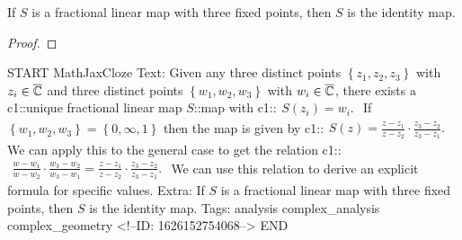 \documentclass{memoir}
\begin{document}
\begin{lemma}
	If \(S\) is a fractional linear map with three fixed points, then \(S\) is the identity map.
\end{lemma}

\begin{proof}
	
\end{proof}

\begin{anki}
START
MathJaxCloze
Text: Given any three distinct points \(\left\{ z_1,z_2,z_3 \right\} \) with \(z_i \in \overline{\mathbb{C}}\) and three distinct points \(\left\{ w_1,w_2,w_3 \right\} \) with \(w_i \in \overline{\mathbb{C}}\), there exists a {{c1::unique fractional linear map \(S\)::map}} with
{{c1::\(\begin{align*}
        	S(z_i) = w_i.
        \end{align*}\)}}
If \(\left\{ w_1,w_2,w_3 \right\} = \left\{ 0,\infty,1 \right\} \) then the map is given by
 {{c1::\(\begin{align*}
        	S(z) = \frac{z-z_1}{z-z_2}\cdot \frac{z_3-z_2}{z_3-z_1}.
        \end{align*}\)}}
We can apply this to the general case to get the relation
 {{c1::\(\begin{align*}
        	\frac{w-w_1}{w-w_2}\cdot \frac{w_3-w_2}{w_3-w_1} = \frac{z-z_1}{z-z_2}\cdot \frac{z_3-z_2}{z_3-z_1}.
        \end{align*}\)}} 
We can use this relation to derive an explicit formula for specific values.
Extra: If \(S\) is a fractional linear map with three fixed points, then \(S\) is the identity map.
Tags: analysis complex_analysis complex_geometry
<!--ID: 1626152754068-->
END
\end{anki}




\end{document}
